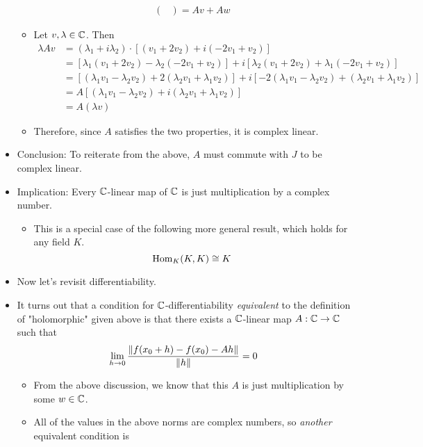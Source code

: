 \documentclass[../notes.tex]{subfiles}
\begin{document}
\begin{itemize}
\begin{itemize}
\begin{align*}
\begin{pmatrix}
            \end{pmatrix}
            = Av+Aw
        \end{align*}
        \item Let $v,\lambda\in\mathbb{C}$. Then
        \begin{align*}
            \lambda Av &= (\lambda_1+i\lambda_2)\cdot[(v_1+2v_2)+i(-2v_1+v_2)]\\
            &= [\lambda_1(v_1+2v_2)-\lambda_2(-2v_1+v_2)]+i[\lambda_2(v_1+2v_2)+\lambda_1(-2v_1+v_2)]\\
            &= [(\lambda_1v_1-\lambda_2v_2)+2(\lambda_2v_1+\lambda_1v_2)]+i[-2(\lambda_1v_1-\lambda_2v_2)+(\lambda_2v_1+\lambda_1v_2)]\\
            &= A[(\lambda_1v_1-\lambda_2v_2)+i(\lambda_2v_1+\lambda_1v_2)]\\
            &= A(\lambda v)
        \end{align*}
        \item Therefore, since $A$ satisfies the two properties, it is complex linear.
    \end{itemize}
    \item Conclusion: To reiterate from the above, $A$ must commute with $J$ to be complex linear.
    \item Implication: Every $\mathbb{C}$-linear map of $\mathbb{C}$ is just multiplication by a complex number.
    \begin{itemize}
        \item This is a special case of the following more general result, which holds for any field $K$.
        \begin{equation*}
            \operatorname{Hom}_K(K,K) \cong K
        \end{equation*}
    \end{itemize}
    \item Now let's revisit differentiability.
    \item It turns out that a condition for $\mathbb{C}$-differentiability \emph{equivalent} to the definition of "holomorphic" given above is that there exists a $\mathbb{C}$-linear map $A:\mathbb{C}\to\mathbb{C}$ such that
    \begin{equation*}
        \lim_{h\to 0}\frac{\norm{f(x_0+h)-f(x_0)-Ah}}{\norm{h}} = 0
    \end{equation*}
    \begin{itemize}
        \item From the above discussion, we know that this $A$ is just multiplication by some $w\in\mathbb{C}$.
        \item All of the values in the above norms are complex numbers, so \emph{another} equivalent condition is

\end{itemize}
\end{itemize}
\end{document}
